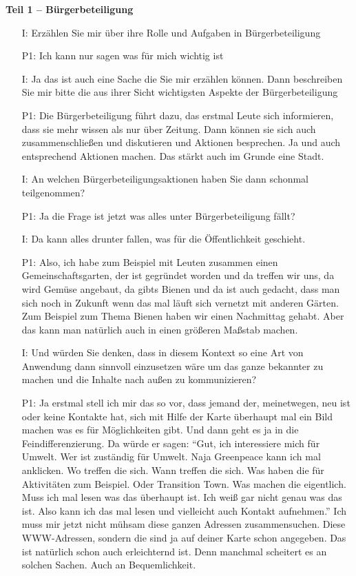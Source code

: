 \textbf{Teil 1 -- B{\"u}rgerbeteiligung}
\begin{itemize}
    \item[I:] Erz{\"a}hlen Sie mir {\"u}ber ihre Rolle und Aufgaben in B{\"u}rgerbeteiligung
    \item[P1:] Ich kann nur sagen was f{\"u}r mich wichtig ist
    \item[I:] Ja das ist auch eine Sache die Sie mir erz{\"a}hlen k{\"o}nnen. Dann beschreiben Sie mir bitte die aus ihrer Sicht wichtigsten Aspekte der B{\"u}rgerbeteiligung
    \item[P1:] Die B{\"u}rgerbeteiligung f{\"u}hrt dazu, das erstmal Leute sich informieren, dass sie mehr wissen als nur {\"u}ber Zeitung. Dann k{\"o}nnen sie sich auch zusammenschlie{\ss}en und diskutieren und Aktionen besprechen. Ja und auch entsprechend Aktionen machen. Das st{\"a}rkt auch im Grunde eine Stadt.
    \item[I:] An welchen B{\"u}rgerbeteiligungsaktionen haben Sie dann schonmal teilgenommen?
	\item[P1:] Ja die Frage ist jetzt was alles unter B{\"u}rgerbeteiligung f{\"a}llt?
	\item[I:] Da kann alles drunter fallen, was f{\"u}r die {\"O}ffentlichkeit geschieht.
	\item[P1:] Also, ich habe zum Beispiel mit Leuten zusammen einen Gemeinschaftsgarten, der ist gegr{\"u}ndet worden und da treffen wir uns, da wird Gem{\"u}se angebaut, da gibts Bienen und da ist auch gedacht, dass man sich noch in Zukunft wenn das mal l{\"a}uft sich vernetzt mit anderen G{\"a}rten. Zum Beispiel zum Thema Bienen haben wir einen Nachmittag gehabt. Aber das kann man nat{\"u}rlich auch in einen gr{\"o}{\ss}eren Ma{\ss}stab machen.
	\item[I:] Und w{\"u}rden Sie denken, dass in diesem Kontext so eine Art von Anwendung dann sinnvoll einzusetzen w{\"a}re um das ganze bekannter zu machen und die Inhalte nach au{\ss}en zu kommunizieren?
	\item[P1:] Ja erstmal stell ich mir das so vor, dass jemand der, meinetwegen, neu ist oder keine Kontakte hat, sich mit Hilfe der Karte {\"u}berhaupt mal ein Bild machen was es f{\"u}r M{\"o}glichkeiten gibt. Und dann geht es ja in die Feindifferenzierung. Da w{\"u}rde er sagen: "`Gut, ich interessiere mich f{\"u}r Umwelt. Wer ist zust{\"a}ndig f{\"u}r Umwelt. Naja Greenpeace kann ich mal anklicken. Wo treffen die sich. Wann treffen die sich. Was haben die f{\"u}r Aktivit{\"a}ten zum Beispiel. Oder Transition Town. Was machen die eigentlich. Muss ich mal lesen was das {\"u}berhaupt ist. Ich wei{\ss} gar nicht genau was das ist. Also kann ich das mal lesen und vielleicht auch Kontakt aufnehmen."' Ich muss mir jetzt nicht m{\"u}hsam diese ganzen Adressen zusammensuchen. Diese WWW-Adressen, sondern die sind ja auf deiner Karte schon angegeben. Das ist nat{\"u}rlich schon auch erleichternd ist. Denn manchmal scheitert es an solchen Sachen. Auch an Bequemlichkeit.

\end{itemize}
